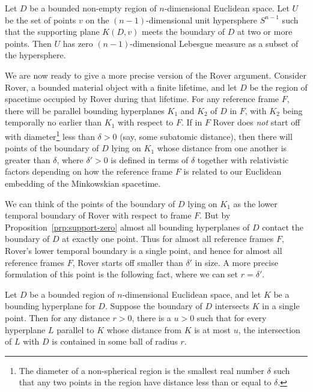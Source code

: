 \begin{prp}\label{prp:support-zero}
Let $D$ be a bounded non-empty region of $n$-dimensional Euclidean space. Let $U$ be the set of points $v$ on the 
$(n-1)$-dimensional unit hypersphere $S^{n-1}$ such that the supporting plane $K(D,v)$ meets the boundary of $D$ at two or more points. Then $U$ has zero $(n-1)$-dimensional Lebesgue measure as a subset of the hypersphere.
\end{prp}

We are now ready to give a more precise version of the Rover argument. Consider Rover, a bounded material object with a finite lifetime, and let $D$ be the region of spacetime occupied by Rover during that lifetime.  For any reference frame $F$, there will be parallel bounding hyperplanes $K_1$ and $K_2$ of $D$ in $F$, with $K_2$ being temporally no earlier than $K_1$ with respect to $F$.  If in $F$ Rover does \textit{not} start off with diameter\footnote{The diameter of a non-spherical region is the smallest real number $\delta$ such that any two points in the region have distance less than or equal to $\delta$.} less than $\delta>0$ (say, some subatomic distance), then there will points of the boundary of $D$ lying on $K_1$ whose distance from one another is greater than $\delta$, where $\delta'>0$ is defined in terms of $\delta$ together with relativistic factors depending on how the reference frame $F$ is related to our Euclidean embedding of the Minkowskian spacetime.

We can think of the points of the boundary of $D$ lying on $K_1$ as the lower temporal boundary of Rover with respect to frame $F$.
But by Proposition~\ref{prp:support-zero} almost all bounding hyperplanes of $D$ contact the boundary of $D$ at exactly one point. Thus for almost all reference frames $F$, Rover's lower temporal boundary is a single point, and hence for almost all reference frames $F$, Rover starts off smaller than $\delta'$ in size. A more precise formulation of this point is the following fact, where we can set $r=\delta'$.

\begin{prp}\label{prp:distance} Let $D$ be a bounded region of $n$-dimensional Euclidean space, and let $K$ be a bounding hyperplane for $D$. Suppose the boundary of $D$ intersects $K$ in a single point. Then for any distance $r>0$, there is a $u>0$ such that for every hyperplane $L$ parallel to $K$ whose distance from $K$ is at most $u$, the intersection of $L$ with $D$ is contained in some ball of radius $r$.
\end{prp}

